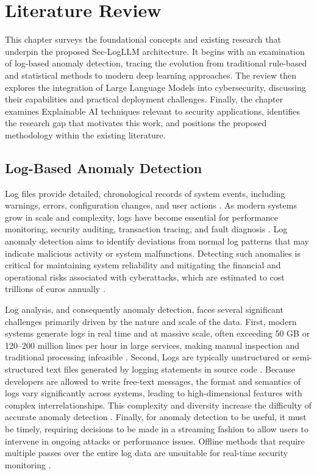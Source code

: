 \section{Literature Review}\label{chapter:lit-review}

This chapter surveys the foundational concepts and existing research that underpin the proposed Sec-LogLLM architecture. It begins with an examination of log-based anomaly detection, tracing the evolution from traditional rule-based and statistical methods to modern deep learning approaches. The review then explores the integration of Large Language Models into cybersecurity, discussing their capabilities and practical deployment challenges. Finally, the chapter examines Explainable AI techniques relevant to security applications, identifies the research gap that motivates this work, and positions the proposed methodology within the existing literature.

\subsection{Log-Based Anomaly Detection}\label{sec:log-ad}

Log files provide detailed, chronological records of system events, including warnings, errors, configuration changes, and user actions \cite{almodovar-etal-2022-language, DeepLog, aws_log_files, LogFormer}. As modern systems grow in scale and complexity, logs have become essential for performance monitoring, security auditing, transaction tracing, and fault diagnosis \cite{LogCTBL}. Log anomaly detection aims to identify deviations from normal log patterns that may indicate malicious activity or system malfunctions. Detecting such anomalies is critical for maintaining system reliability and mitigating the financial and operational risks associated with cyberattacks, which are estimated to cost trillions of euros annually \cite{europeanparliament2024cybercrime}.

Log analysis, and consequently anomaly detection, faces several significant challenges primarily driven by the nature and scale of the data. First, modern systems generate logs in real time and at massive scale, often exceeding 50 GB or 120–200 million lines per hour in large services, making manual inspection and traditional processing infeasible \cite{LAnoBERT, LogFormer}.
Second, Logs are typically unstructured or semi-structured text files generated by logging statements in source code \cite{DeepLog}. Because developers are allowed to write free-text messages, the format and semantics of logs vary significantly across systems, leading to high-dimensional features with complex interrelationships. This complexity and diversity increase the difficulty of accurate anomaly detection \cite{Drain}.
Finally, for anomaly detection to be useful, it must be timely, requiring decisions to be made in a streaming fashion to allow users to intervene in ongoing attacks or performance issues. Offline methods that require multiple passes over the entire log data are unsuitable for real-time security monitoring \cite{DeepLog}.


